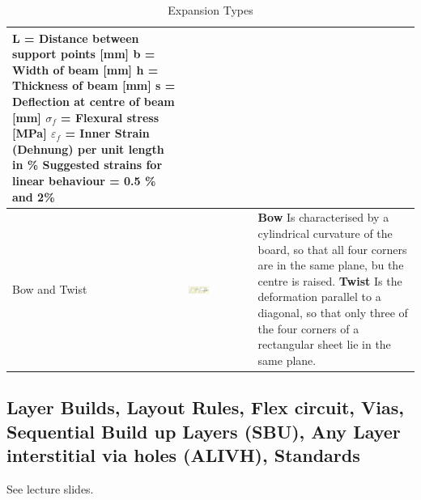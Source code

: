 \begin{table}[h!]
\begin{tabular}{|m{}|m{}|m{}|}
				L = Distance between support points [mm]\newline
				b = Width of beam [mm] \newline
				h = Thickness of beam [mm]\newline
				s = Deflection at centre of beam [mm]\newline
				$\sigma_f$ = Flexural stress [MPa]\newline
				$\varepsilon_f$ = Inner Strain (Dehnung) per unit length in \% \newline
				Suggested strains for linear behaviour = 0.5 \% and 2\%
			\\
		\hline
				Bow and Twist
			& 
				 \begin{center}\includegraphics[width=0.35\textwidth]{images/BowTwist.png}\end{center}  
			&
				\textbf{Bow}\newline
				Is characterised by a cylindrical curvature of the board, so that all four corners are in the same plane, bu the centre is raised. \newline
				\textbf{Twist}\newline
				Is the deformation parallel to a diagonal, so that only three of the four corners of a rectangular sheet lie in the same plane. 
			\\
		\hline
		\end{tabular}
		
		\caption{Expansion Types}
		\label{Tab:ExpansionTypes}
		\end{table}
	\subsection{Layer Builds, Layout Rules, Flex circuit, Vias, Sequential Build up Layers (SBU), Any Layer interstitial via holes (ALIVH), Standards}
	See lecture slides. 
\newpage